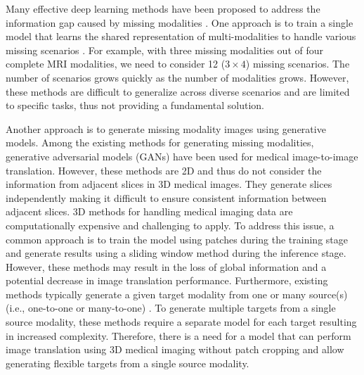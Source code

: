 \documentclass[10pt,twocolumn,letterpaper]{article}
\begin{document}
Many effective deep learning methods have been proposed to address the information gap caused by missing modalities \cite{van2015does, li2014deep, havaei2016hemis, chen2019robust, zhou2020brain, NEURIPS2021_0f281810, dalmaz2022resvit}. One approach is to train a single model that learns the shared representation of multi-modalities to handle various missing scenarios \cite{van2015does, li2014deep, chen2019robust, zhou2020brain}. For example, with three missing modalities out of four complete MRI modalities, we need to consider 12 ($3\times4$) missing scenarios. The number of scenarios grows quickly as the number of modalities grows.  However, these methods are difficult to generalize across diverse scenarios and are limited to specific tasks, thus not providing a fundamental solution.



Another approach is to generate missing modality images using generative models. Among the existing methods for generating missing modalities, generative adversarial models (GANs) \cite{NIPS2014_5ca3e9b1, isola2017image, zhu2017unpaired, chen2020reusing, NEURIPS2021_0f281810, dalmaz2022resvit} have been used for medical image-to-image translation. However, these methods are 2D and thus  do not consider the information from adjacent slices in 3D medical images. They generate slices independently making it difficult to ensure consistent information between adjacent slices. 3D methods for handling medical imaging data are computationally expensive and challenging to apply. To address this issue, a common approach is to train the model using patches during the training stage and generate results using a sliding window method during the inference stage. However, these methods may result in the loss of global information and a potential decrease in image translation performance. Furthermore, existing methods typically generate a given target modality from one or many source(s) (i.e., one-to-one or many-to-one) \cite{9004544, NEURIPS2021_0f281810, dalmaz2022resvit}. To generate multiple targets from a single source modality, these methods require a separate model for each target resulting in increased complexity. Therefore, there is a need for a model that can perform image translation using 3D medical imaging without patch cropping and allow generating flexible targets from a single source modality.
\end{document}
